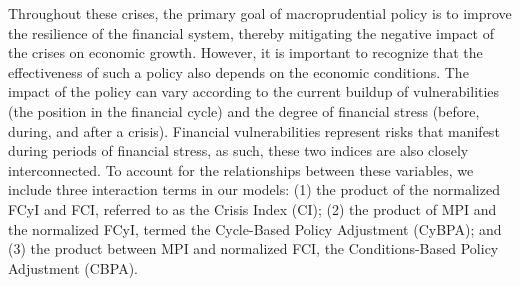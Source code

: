 Throughout these crises, the primary goal of macroprudential policy is to improve the resilience of the financial system, thereby mitigating the negative impact of the crises on economic growth. However, it is important to recognize that the effectiveness of such a policy also depends on the economic conditions. The impact of the policy can vary according to the current buildup of vulnerabilities (the position in the financial cycle) and the degree of financial stress (before, during, and after a crisis). Financial vulnerabilities represent risks that manifest during periods of financial stress, as such, these two indices are also closely interconnected. To account for the relationships between these variables, we include three interaction terms in our models: (1) the product of the normalized FCyI and FCI, referred to as the Crisis Index (CI); (2) the product of MPI and the normalized FCyI, termed the Cycle-Based Policy Adjustment (CyBPA); and (3) the product between MPI and normalized FCI, the Conditions-Based Policy Adjustment (CBPA).
